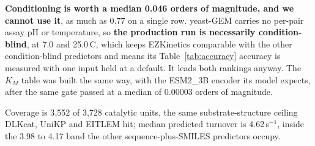 \textbf{Conditioning is worth a median 0.046 orders of magnitude, and we cannot use it}, as
much as 0.77 on a single row. yeast-GEM carries no per-pair assay pH or temperature, so
\textbf{the production run is necessarily condition-blind}, at 7.0 and 25.0\,\textdegree C,
which keeps EZKinetics comparable with the other condition-blind predictors and means its
Table~\ref{tab:accuracy} accuracy is measured with one input held at a default. It leads both
rankings anyway. The $K_M$ table was built the same way, with the ESM2\_3B encoder its
model expects, after the same gate passed at a median of 0.00003 orders of magnitude.

Coverage is 3{,}552 of 3{,}728 catalytic units, the same substrate-structure ceiling
DLKcat, UniKP and EITLEM hit; median predicted turnover is 4.62\,s$^{-1}$, inside the 3.98
to 4.17 band the other sequence-plus-SMILES predictors occupy.
